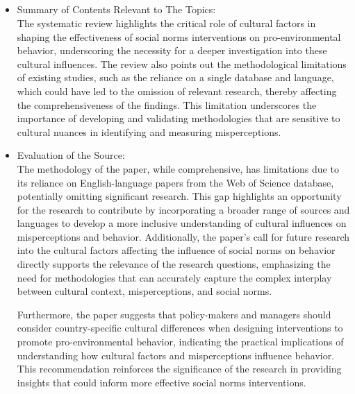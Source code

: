 \documentclass{article}
\begin{document}
\subsection{}
\begin{itemize}
    \item Summary of Contents Relevant to The Topics:\\
The systematic review highlights the critical role of cultural factors in shaping the effectiveness of social norms interventions on pro-environmental behavior, underscoring the necessity for a deeper investigation into these cultural influences. The review also points out the methodological limitations of existing studies, such as the reliance on a single database and language, which could have led to the omission of relevant research, thereby affecting the comprehensiveness of the findings. This limitation underscores the importance of developing and validating methodologies that are sensitive to cultural nuances in identifying and measuring misperceptions.
\end{itemize}
\begin{itemize}
    \item Evaluation of the Source:\\
The methodology of the paper, while comprehensive, has limitations due to its reliance on English-language papers from the Web of Science database, potentially omitting significant research. This gap highlights an opportunity for the research to contribute by incorporating a broader range of sources and languages to develop a more inclusive understanding of cultural influences on misperceptions and behavior. Additionally, the paper's call for future research into the cultural factors affecting the influence of social norms on behavior directly supports the relevance of the research questions, emphasizing the need for methodologies that can accurately capture the complex interplay between cultural context, misperceptions, and social norms.

Furthermore, the paper suggests that policy-makers and managers should consider country-specific cultural differences when designing interventions to promote pro-environmental behavior, indicating the practical implications of understanding how cultural factors and misperceptions influence behavior. This recommendation reinforces the significance of the research in providing insights that could inform more effective social norms interventions.
\end{itemize}
\end{document}
